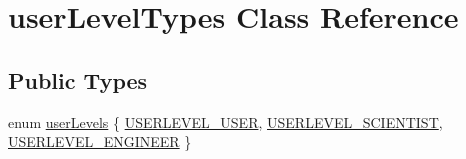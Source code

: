 \hypertarget{classuserLevelTypes}{
\section{userLevelTypes Class Reference}
\label{classuserLevelTypes}
}
\subsection*{Public Types}
\begin{DoxyCompactItemize}
\item 
enum \hyperlink{classuserLevelTypes_a033cf2a40f620286b1839dd360c8497b}{userLevels} \{ \hyperlink{classuserLevelTypes_a033cf2a40f620286b1839dd360c8497baf1de7d906a9db64a2fae68788e26ac26}{USERLEVEL\_\-USER}, 
\hyperlink{classuserLevelTypes_a033cf2a40f620286b1839dd360c8497bad543b90d5269054979983b2793f21c14}{USERLEVEL\_\-SCIENTIST}, 
\hyperlink{classuserLevelTypes_a033cf2a40f620286b1839dd360c8497bafd64c80b35618eb98bb9e0f085dd4449}{USERLEVEL\_\-ENGINEER}
 \}
\end{DoxyCompactItemize}


